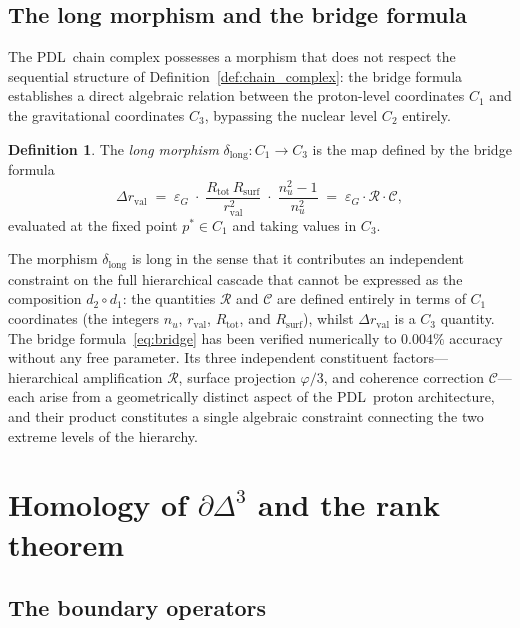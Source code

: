 \documentclass[11pt,a4paper]{article}
\theoremstyle{definition}
\newtheorem{definition}[theorem]{Definition}
\newcommand{\PDL}{\textnormal{PDL}}
\newcommand{\Rsurf}{R_{\mathrm{surf}}}
\newcommand{\Rtot}{R_{\mathrm{tot}}}
\newcommand{\rval}{r_{\mathrm{val}}}
\newcommand{\epsg}{\varepsilon_G}
\newcommand{\dmap}[1]{d_{#1}}
\newcommand{\dlong}{\delta_{\mathrm{long}}}
\newcommand{\calR}{\mathcal{R}}
\newcommand{\calC}{\mathcal{C}}
\newcommand{\vp}{\varphi}
\begin{document}
\subsection{The long morphism and the bridge formula}
\label{subsec:long}

The \PDL\ chain complex possesses a morphism that does not respect the sequential structure of Definition~\ref{def:chain_complex}: the bridge formula establishes a direct algebraic relation between the proton-level coordinates $C_1$ and the gravitational coordinates $C_3$, bypassing the nuclear level $C_2$ entirely.

\begin{definition}
  \label{def:long_morphism}
  The \emph{long morphism} $\dlong : C_1 \to C_3$ is the map defined by the bridge formula\cite{Bridge_Formula_PDL_2026}
  \begin{equation}
    \label{eq:bridge}
    \Delta\rval \;=\; \epsg \;\cdot\; \frac{\Rtot\,\Rsurf}{\rval^2} \;\cdot\; \frac{n_u^2 - 1}{n_u^2} \;=\; \epsg \cdot \calR \cdot \calC,
  \end{equation}
  evaluated at the fixed point $p^* \in C_1$ and taking values in $C_3$.
\end{definition}

The morphism $\dlong$ is long in the sense that it contributes an independent constraint on the full hierarchical cascade that cannot be expressed as the composition $\dmap{2} \circ \dmap{1}$: the quantities $\calR$ and $\calC$ are defined entirely in terms of $C_1$ coordinates (the integers $n_u$, $\rval$, $\Rtot$, and $\Rsurf$), whilst $\Delta\rval$ is a $C_3$ quantity. The bridge formula~\eqref{eq:bridge} has been verified numerically to $0.004\%$ accuracy without any free parameter.\cite{Bridge_Formula_PDL_2026} Its three independent constituent factors---hierarchical amplification $\calR$, surface projection $\vp/3$, and coherence correction $\calC$---each arise from a geometrically distinct aspect of the \PDL\ proton architecture, and their product constitutes a single algebraic constraint connecting the two extreme levels of the hierarchy.

\section{Homology of \texorpdfstring{$\partial\Delta^3$}{∂Δ³} and the rank theorem}
\label{sec:homology}

\subsection{The boundary operators}
\label{subsec:boundary}
\end{document}
